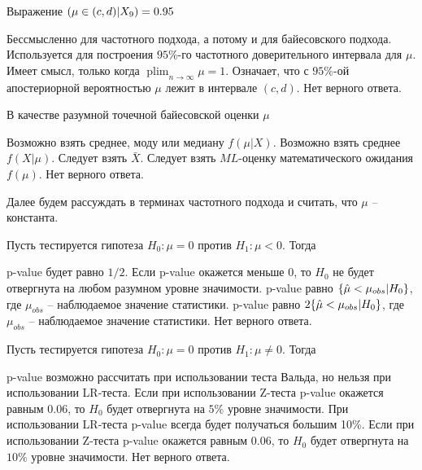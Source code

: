 \documentclass[10pt, a4paper]{exam}
\DeclareMathOperator*\plim{plim}
\let\P\relax
\DeclareMathOperator{\P}{\mathbb{P}}
\begin{document}
\begin{questions}
		\question Выражение $\P(\mu \in (c, d) | X_9) = 0.95$
		\begin{choices}
			\choice Бессмысленно для частотного подхода, а потому и для байесовского подхода.
			\choice Используется для построения $95\%$-го частотного доверительного интервала для $\mu$.
			\choice Имеет смысл, только когда $\plim_{n \to \infty} \mu = 1$. 
			\choice Означает, что с $95\%$-ой апостериорной вероятностью $\mu$ лежит в интервале $(c, d)$.
			\choice Нет верного ответа.
		\end{choices}
	
		\question В качестве разумной точечной байесовской оценки $\mu$
		\begin{choices}
			\choice Возможно взять среднее, моду или медиану $f(\mu | X)$.
			\choice Возможно взять среднее $f(X|\mu)$.
			\choice Следует взять $\bar{X}$.
			\choice Следует взять $ML$-оценку математического ожидания $f(\mu)$.
			\choice Нет верного ответа.
		\end{choices}
		\vspace{1em}
	
		Далее будем рассуждать в терминах частотного подхода и считать, что $\mu$ -- константа.
		\vspace{1em}
		
		\question Пусть тестируется гипотеза $H_0: \mu = 0$ против $H_1: \mu < 0$. Тогда
		\begin{choices}
			\choice p-value будет равно $1/2$.
			\choice Если p-value окажется меньше 0, то $H_0$ не будет отвергнута на любом разумном уровне значимости.
			\choice p-value равно $\P\{\hat{\mu} < \mu_{obs} | H_0\}$, где $\mu_{obs}$ -- наблюдаемое значение статистики.
			\choice p-value равно $2\P\{\hat{\mu} < \mu_{obs} | H_0\}$, где $\mu_{obs}$ -- наблюдаемое значение статистики.
			\choice Нет верного ответа.
		\end{choices}
	
		\question Пусть тестируется гипотеза $H_0: \mu = 0$ против $H_1: \mu \ne 0$. Тогда
		\begin{choices}
			\choice p-value возможно рассчитать при использовании теста Вальда, но нельзя при использовании LR-теста.
			\choice Если при использовании Z-теста p-value окажется равным 0.06, то $H_0$ будет отвергнута на $5\%$ уровне значимости.
			\choice При использовании LR-теста p-value всегда будет получаться большим 10\%.
			\choice Если при использовании Z-теста p-value окажется равным 0.06, то $H_0$ будет отвергнута на $10\%$ уровне значимости.
			\choice Нет верного ответа.
		\end{choices}
	\end{questions}
	
\end{document}
